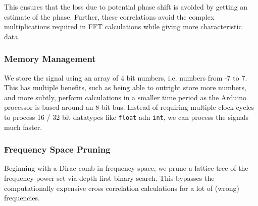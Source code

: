 This ensures that the loss due to potential phase shift is avoided by getting an
estimate of the phase. Further, these correlations avoid the complex
multiplications required in FFT calculations while giving more characteristic
data. 

\subsubsection{Memory Management}
We store the signal using an array of 4 bit numbers, i.e. numbers from -7 to 7.
This has multiple benefits, such as being able to outright store more numbers,
and more subtly, perform calculations in a smaller time period as the Arduino
processor is based around an 8-bit bus. Instead of requiring multiple clock
cycles to process 16 / 32 bit datatypes like \texttt{float} adn \texttt{int}, we
can process the signals much faster.

\subsubsection{Frequency Space Pruning}
Beginning with a Dirac comb in frequency space, we prune a lattice tree of the
frequency power set via depth first binary search. This bypasses the
computationally expensive cross correlation calculations for a lot of (wrong)
frequencies. 